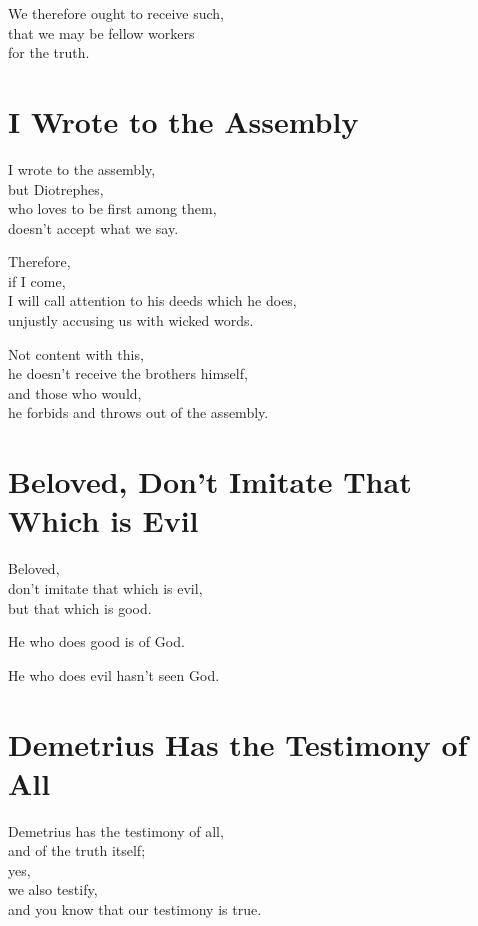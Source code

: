 We therefore ought to receive such,
\\
that we may be fellow workers
\\
\tab{}
for the truth.

\newpage\section{I Wrote to the Assembly}

I wrote to the assembly,
\\
but Diotrephes,
\\
\tab{}
who loves to be first among them,
\\
doesn’t accept what we say.

Therefore,
\\
if I come,
\\
I will call attention to his deeds which he does,
\\
\tab{}
unjustly accusing us with wicked words.

Not content with this,
\\
\tab{}
he doesn’t receive the brothers himself,
\\
\tab{}
and those who would,
\\
\tab{}
\tab{}
he forbids and throws out of the assembly.

\newpage\section{Beloved, Don’t Imitate That Which is Evil}

Beloved,
\\
don’t imitate that which is evil,
\\
but that which is good.

He who does good is of God.

He who does evil hasn’t seen God.

\newpage\section{Demetrius Has the Testimony of All}

Demetrius has the testimony of all,
\\
and of the truth itself;
\\
yes,
\\
we also testify,
\\
and you know that our testimony is true.

